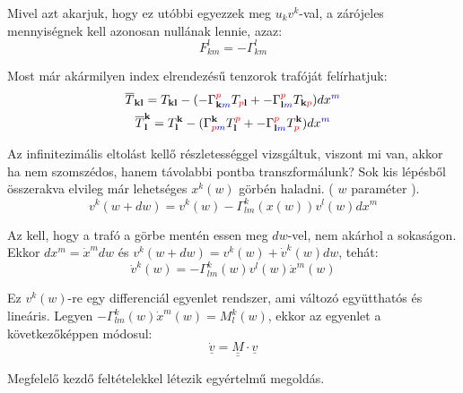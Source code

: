 \documentclass[a4paper,12pt]{article}
\def\doubleunderline#1{\underline{\underline{#1}}}
\begin{document}
\par Mivel azt akarjuk, hogy ez utóbbi egyezzek meg $u_{k}v^{k}$-val, a zárójeles mennyiségnek kell azonosan nullának lennie, azaz:
\begin{equation*}
    F_{km}^{l} = -\Gamma_{km}^{l}
\end{equation*}
\par Most már akármilyen index elrendezésű tenzorok trafóját felírhatjuk:
\begin{gather*}
    \overline{T}_{\textbf{kl}} = T_{\textbf{kl}} - (-\Gamma_{\textbf{k}\textcolor{blue}{m}}^{\textcolor{red}{p}}T_{\textcolor{red}{p}\textbf{l}} + -\Gamma_{\textbf{l}\textcolor{blue}{m}}^{\textcolor{red}{p}}T_{\textbf{k}\textcolor{red}{p}})dx^{\textcolor{blue}{m}} \\
    \overline{T}_{\textbf{l}}^{\textbf{k}} = T^{\textbf{k}}_{\textbf{l}} -  (\Gamma_{\textcolor{red}{p}\textcolor{blue}{m}}^{\textbf{k}}T^{\textcolor{red}{p}}_{\textbf{l}} + -\Gamma_{\textbf{l}\textcolor{blue}{m}}^{\textcolor{red}{p}}T^{\textbf{k}}_{\textcolor{red}{p}})dx^{\textcolor{blue}{m}}
\end{gather*}
\par Az infinitezimális eltolást kellő részletességgel vizsgáltuk, viszont mi van, akkor ha nem szomszédos, hanem távolabbi pontba transzformálunk? Sok kis lépésből összerakva elvileg már lehetséges $x^{k}(w)$ görbén haladni. ( $w$ paraméter ).
\begin{equation*}
    v^{k}(w+dw) = v^{k}(w) - \Gamma_{lm}^{k}(x(w))v^{l}(w)dx^{m}
\end{equation*}
\par Az kell, hogy a trafó a görbe mentén essen meg $dw$-vel, nem akárhol a sokaságon. Ekkor $dx^{m} = \dot{x}^{m}dw$ és $v^{k}(w+dw) = v^{k}(w) + \dot{v}^{k}(w)dw$, tehát:
\begin{equation*}
    \dot{v}^{k}(w) = -\Gamma_{lm}^{k}(w)v^{l}(w)\dot{x}^{m}(w)
\end{equation*}
\par Ez $v^{k}(w)$-re egy differenciál egyenlet rendszer, ami változó együtthatós és lineáris. Legyen $-\Gamma_{lm}^{k}(w)\dot{x}^{m}(w) = M^{k}_{l}(w)$, ekkor az egyenlet a következőképpen módosul:
\begin{equation*}
    \underline{\dot{v}} = \doubleunderline{M}\cdot\underline{v}
\end{equation*}
\par Megfelelő kezdő feltételekkel létezik egyértelmű megoldás.
\end{document}
